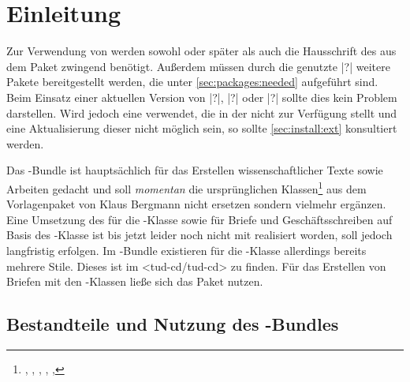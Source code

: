 \chapter{Einleitung}

Zur Verwendung von \vTUDScript{\TUDScript} werden sowohl 
\vKOMAScript{\KOMAScript} oder später als auch die Hausschrift des 
\CDs \OpenSans aus dem Paket  zwingend benötigt. Außerdem 
müssen durch die genutzte \Distro|?| weitere Pakete bereitgestellt werden, die 
unter \autoref{sec:packages:needed} aufgeführt sind. Beim Einsatz einer 
aktuellen Version von \TeXLive|?|, \MacTeX|?| oder \MiKTeX|?| sollte dies kein 
Problem darstellen. Wird jedoch eine \Distro verwendet, die \TUDScript in 
der  nicht zur Verfügung stellt und eine Aktualisierung 
dieser nicht möglich sein, so sollte \autoref{sec:install:ext} konsultiert 
werden.

Das \TUDScript-Bundle ist hauptsächlich für das Erstellen wissenschaftlicher 
Texte sowie Arbeiten gedacht und soll \emph{momentan} die ursprünglichen 
Klassen\footnote{%
  , , , , 
  , %
} aus dem Vorlagenpaket von Klaus Bergmann nicht ersetzen sondern vielmehr 
ergänzen. 
%
Eine Umsetzung des \CDs für die -Klasse sowie für Briefe und 
Geschäftsschreiben auf Basis des \KOMAScript-Klasse  
ist bis jetzt leider noch nicht mit \TUDScript realisiert worden, soll jedoch 
langfristig erfolgen. Im -Bundle existieren für die 
-Klasse allerdings bereits mehrere Stile. Dieses ist im 
\GitHubRepo<tud-cd/tud-cd> zu finden. Für das Erstellen von Briefen mit den 
\TUDScript-Klassen ließe sich das Paket  nutzen.



\section{Bestandteile und Nutzung des \TUDScript-Bundles}

